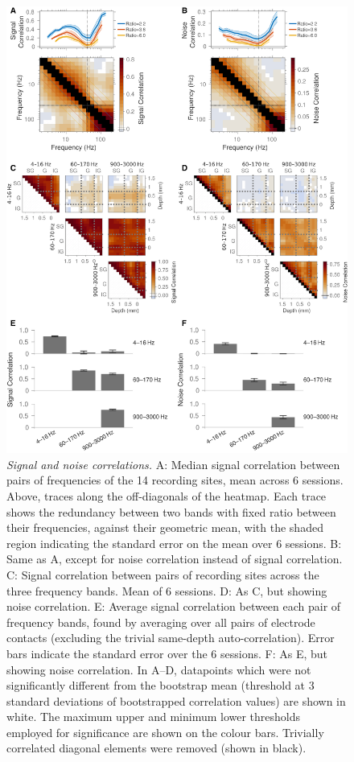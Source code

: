 \begin{figure}
\centering \includegraphics[width=\columnwidth]{paperfigs/figS3}
%
\caption{%
\textit{Signal and noise correlations.}
A: Median signal correlation between pairs of frequencies of the 14 recording sites, mean across 6 sessions.
Above, traces along the off-diagonals of the heatmap.
Each trace shows the redundancy between two bands with fixed ratio between their frequencies, against their geometric mean, with the shaded region indicating the standard error on the mean over 6 sessions.
B: Same as A, except for noise correlation instead of signal correlation.
C: Signal correlation between pairs of recording sites across the three frequency bands.
Mean of 6 sessions.
D: As C, but showing noise correlation.
E: Average signal correlation between each pair of frequency bands, found by averaging over all pairs of electrode contacts (excluding the trivial same-depth auto-correlation).
Error bars indicate the standard error over the 6 sessions.
F: As E, but showing noise correlation.
In A--D, datapoints which were not significantly different from the bootstrap mean (threshold at 3 standard deviations of bootstrapped correlation values) are shown in white.
The maximum upper and minimum lower thresholds employed for significance are shown on the colour bars.
Trivially correlated diagonal elements were removed (shown in black).
}
\label{fig:lam_s3}
%
\end{figure}


